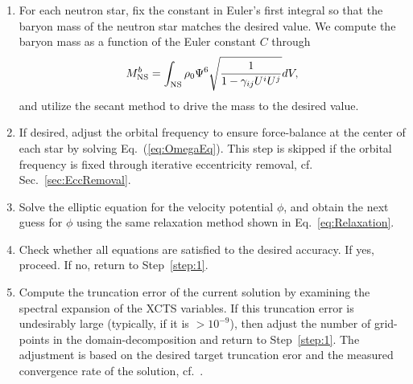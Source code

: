 \documentclass[aps,prd,amsmath,floatfix
,twocolumn
,superscriptaddress,nofootinbib,showpacs]{revtex4-1}
\theoremstyle{plain} \newtheorem{thm}{Theorem} \newtheorem{lem}{Lemma}
\newcommand{\red}[1]{\textcolor{Red}{#1}}
\newcommand{\roland}[1]{\textcolor{Magenta}{\textit{ROLAND: #1}}}
\begin{document}
\begin{enumerate}
\item For each neutron star, fix the constant in Euler's first
  integral so that the baryon mass of the neutron star matches the desired
  value.  We compute the baryon mass as a function of the Euler constant $C$
through %
\begin{equation}
M^b_{\rm NS} = \int_{\rm
  NS}\rho_0\Psi^6\sqrt{\frac{1}{1-\gamma_{ij}U^iU^j}}dV,
\end{equation}
and utilize the secant method
to drive the mass to the desired value.
\item If desired, adjust the orbital frequency to ensure force-balance at the
  center of each star by solving Eq.~(\ref{eq:OmegaEq}). This step is
  skipped if the orbital frequency is fixed through iterative eccentricity removal, cf. Sec.~\ref{sec:EccRemoval}.
\item Solve the elliptic equation for the velocity potential $\phi$,
  and obtain the next guess for $\phi$ using the same relaxation
  method shown in Eq.~\ref{eq:Relaxation}.
\item  Check whether all equations are satisfied to the desired accuracy. If yes, proceed.  If no, return to Step~\ref{step:1}.
\item Compute the truncation error of the current solution by
    examining the spectral expansion of the XCTS variables.  If this
    truncation error is undesirably large (typically, if it is
    $>10^{-9}$), then adjust the number of grid-points in the
    domain-decomposition and return to Step~\ref{step:1}.  The adjustment
is based on the desired target truncation eror and the measured convergence rate of the solution, cf.~\cite{Szilagyi:2014fna}.
\end{enumerate}
\end{document}
